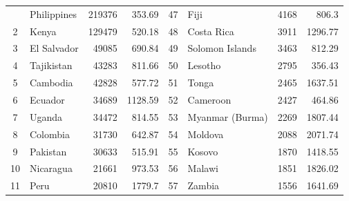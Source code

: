 \begin{longtable}{|c|l|r|r|c|l|r|r|}
	\hline \hline
	\endlastfoot
	1           & Philippines           & 219376                 & 353.69                          & 47          & Fiji                  & 4168                   & 806.3                           \\
	2           & Kenya                 & 129479                 & 520.18                          & 48          & Costa Rica            & 3911                   & 1296.77                         \\
	3           & El Salvador           & 49085                  & 690.84                          & 49          & Solomon Islands       & 3463                   & 812.29                          \\
	4           & Tajikistan            & 43283                  & 811.66                          & 50          & Lesotho               & 2795                   & 356.43                          \\
	5           & Cambodia              & 42828                  & 577.72                          & 51          & Tonga                 & 2465                   & 1637.51                         \\
	6           & Ecuador               & 34689                  & 1128.59                         & 52          & Cameroon              & 2427                   & 464.86                          \\
	7           & Uganda                & 34472                  & 814.55                          & 53          & Myanmar (Burma)       & 2269                   & 1807.44                         \\
	8           & Colombia              & 31730                  & 642.87                          & 54          & Moldova               & 2088                   & 2071.74                         \\
	9           & Pakistan              & 30633                  & 515.91                          & 55          & Kosovo                & 1870                   & 1418.55                         \\
	10          & Nicaragua             & 21661                  & 973.53                          & 56          & Malawi                & 1851                   & 1826.02                         \\
	11          & Peru                  & 20810                  & 1779.7                          & 57          & Zambia                & 1556                   & 1641.69                         \\

\end{longtable}
